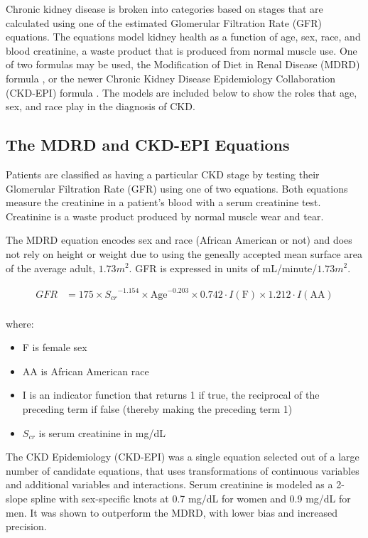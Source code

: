 \documentclass[12pt]{ociamthesis}\usepackage[]{graphicx}\usepackage[]{color}
\begin{document}
Chronic kidney disease is broken into categories based on stages that are calculated using one of the estimated Glomerular Filtration Rate
(GFR) equations. The equations model kidney health as a function of age, sex, race, and blood creatinine, a waste product that is produced from
normal muscle use. One of two formulas may be used, the Modification of Diet in Renal Disease (MDRD) formula \cite{Levey1999}, or the newer
Chronic Kidney Disease Epidemiology Collaboration (CKD-EPI) formula \cite{eGFR2018}. The models are included below to show the roles that
age, sex, and race play in the diagnosis of CKD.

\subsection{The MDRD and CKD-EPI Equations}

Patients are classified as having a particular CKD stage by testing their Glomerular Filtration Rate (GFR) using one of two equations.
Both equations measure the creatinine in a patient's blood with a serum creatinine test. Creatinine is a waste product produced by normal
muscle wear and tear. 

The MDRD equation encodes sex and race (African American or not) and does not rely on height or weight due to using the geneally accepted
mean surface area of the average adult, $1.73m^2$. GFR is expressed in units of mL/minute/$1.73m^2$.

\begin{equation} \label{mdrd}
\begin{split}
  GFR  &= 175 \times {S_{cr}}^{- 1.154} \times \text{Age}^{-0.203} \times 0.742 \cdot I(\text{F}) \times 1.212 \cdot I(\text{AA}) \\
\end{split}
\end{equation}

where:
\begin{itemize}
  \item F is female sex
  \item AA is African American race
  \item I is an indicator function that returns 1 if true, the reciprocal of the preceding term if false (thereby making the preceding term 1)
  \item $S_{cr}$ is serum creatinine in mg/dL
\end{itemize} 

The CKD Epidemiology (CKD-EPI) was a single equation selected out of a large number of candidate equations, that uses transformations of continuous
variables and additional variables and interactions. Serum creatinine is modeled as a 2-slope spline with sex-specific knots at 0.7 mg/dL for women 
and 0.9 mg/dL for men. It was shown to outperform the MDRD, with lower bias and increased precision.  \cite{Levey2009, eGFR2018}
\end{document}
